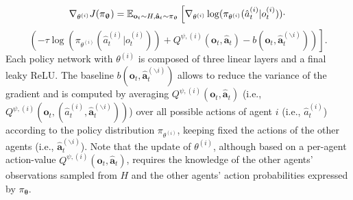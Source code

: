 \begin{equation}
    \nabla_{\theta^{(i)}}J(\pi_{\boldsymbol{\uptheta}}) = \mathbb{E}_{\mathbf{o}_t\sim H, \mathbf{\hat{a}}_t\sim \pi_{\boldsymbol{\uptheta}}} \left[\vphantom{Q^{\psi,(i)}}
	\nabla_{\theta^{(i)}} \log( \pi_{\theta^{(i)}}(\hat{a}^{(i)}_t|o^{(i)}_t ))\cdot \right. \nonumber
 \end{equation}
 \begin{equation}
    \left.\left( -\tau\log( \pi_{\theta^{(i)}}(\hat{a}^{(i)}_t|o^{(i)}_t) )+
	Q^{\psi,(i)}(\mathbf{o}_t,\mathbf{\hat{a}}_t) - b(\mathbf{o}_t,\mathbf{\hat{a}}^{(\backslash i)}_t) \right) \right].
	\label{policy_gradient}
\end{equation}
Each policy network with $\theta^{(i)}$ is composed of three linear layers and a final leaky ReLU.
The baseline $b\left(\mathbf{o}_t,\mathbf{\hat{a}}^{(\backslash i)}_t\right)$ allows to reduce the variance of the gradient and is computed by averaging $Q^{\psi,(i)}(\mathbf{o}_t,\mathbf{\hat{a}}_t)$ (i.e., $Q^{\psi,(i)}(\mathbf{o}_t,(\hat{a}^{(i)}_t,\mathbf{\hat{a}}^{(\backslash i)}_t))$) over all possible actions of agent $i$ (i.e., $\hat{a}^{(i)}_t$) according to the policy distribution $\pi_{\theta^{(i)}}$, keeping fixed the actions of the other agents (i.e., $\mathbf{\hat{a}}^{(\backslash i)}_t$). Note that the update of $\theta^{(i)}$, although based on a per-agent action-value $Q^{\psi,(i)}(\mathbf{o}_t,\mathbf{\hat{a}}_t)$, requires the knowledge of the other agents' observations sampled from $H$ and the other agents' action probabilities expressed by $\pi_{\boldsymbol{\uptheta}}$.

